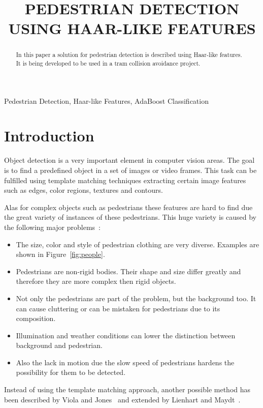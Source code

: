 \documentclass{article}
\title{PEDESTRIAN DETECTION USING HAAR-LIKE FEATURES}
\begin{document}
%
\maketitle
%
\begin{abstract}
In this paper a solution for pedestrian detection is described using Haar-like features. It is being developed to be used in a tram collision avoidance project. 
\end{abstract}
%
\begin{keywords}
Pedestrian Detection, Haar-like Features, AdaBoost Classification
\end{keywords}
%
\section{Introduction}
\label{sec:intro}
Object detection is a very important element in computer vision areas. The goal is to find a predefined object in a set of images or video frames. This task can be fulfilled using template matching techniques extracting certain image features such as edges, color regions, textures and contours.
\par
Alas for complex objects such as pedestrians these features are hard to find due the great variety of instances of these pedestrians. This huge variety is caused by the following major problems~\cite{monteiro2006vision}:
\begin{itemize}
\item The size, color and style of pedestrian clothing are very diverse. Examples are shown in Figure~\ref{fig:people}.
\item Pedestrians are non-rigid bodies. Their shape and size differ greatly and therefore they are more complex then rigid objects.
\item Not only the pedestrians are part of the problem, but the background too. It can cause cluttering or can be mistaken for pedestrians due to its composition.
\item Illumination and weather conditions can lower the distinction between background and pedestrian.
\item Also the lack in motion due the slow speed of pedestrians hardens the possibility for them to be detected.
\end{itemize}
Instead of using the template matching approach, another possible method has been described by Viola and Jones~\cite{viola2001rapid} and extended by Lienhart and Maydt~\cite{lienhart2002extended}.
\end{document}
